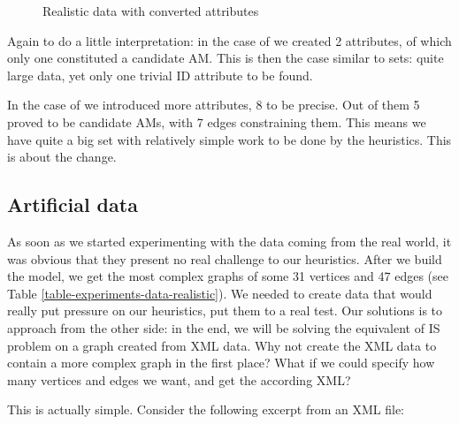 \begin{figure}
  \caption{Realistic data with converted attributes}
  \label{image-experiments-data-converted}
  \centering
\end{figure}

Again to do a little interpretation: in the case of  we created 2 attributes, of which only one constituted a candidate AM. This is then the case similar to  sets: quite large data, yet only one trivial ID attribute to be found.

In the case of  we introduced more attributes, 8 to be precise. Out of them 5 proved to be candidate AMs, with 7 edges constraining them. This means we have quite a big set with relatively simple work to be done by the heuristics. This is about the change.

\subsection{Artificial data}

As soon as we started experimenting with the data coming from the real world, it was obvious that they present no real challenge to our heuristics. After we build the model, we get the most complex graphs of some 31 vertices and 47 edges (see Table \ref{table-experiments-data-realistic}). We needed to create data that would really put pressure on our heuristics, put them to a real test. Our solutions is to approach from the other side: in the end, we will be solving the equivalent of IS problem on a graph created from XML data. Why not create the XML data to contain a more complex graph in the first place? What if we could specify how many vertices and edges we want, and get the according XML?

This is actually simple. Consider the following excerpt from an XML file:

